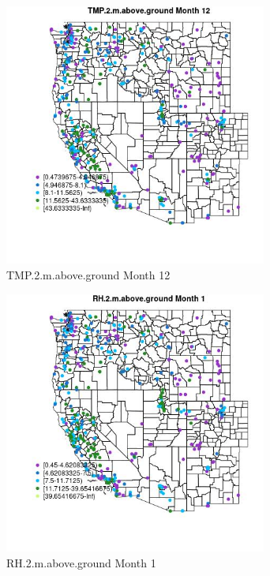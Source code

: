 \begin{figure} 
\centering  
\includegraphics[width=0.77\textwidth]{Code_Outputs/ML_input_report_ML_input_PM25_Step5_part_d_de_duplicated_aves_ML_input_MapObsMo12TMP2maboveground.jpg} 
\caption{\label{fig:ML_input_report_ML_input_PM25_Step5_part_d_de_duplicated_aves_ML_inputMapObsMo12TMP2maboveground}TMP.2.m.above.ground Month 12} 
\end{figure} 
 

\begin{figure} 
\centering  
\includegraphics[width=0.77\textwidth]{Code_Outputs/ML_input_report_ML_input_PM25_Step5_part_d_de_duplicated_aves_ML_input_MapObsMo1RH2maboveground.jpg} 
\caption{\label{fig:ML_input_report_ML_input_PM25_Step5_part_d_de_duplicated_aves_ML_inputMapObsMo1RH2maboveground}RH.2.m.above.ground Month 1} 
\end{figure} 
 

